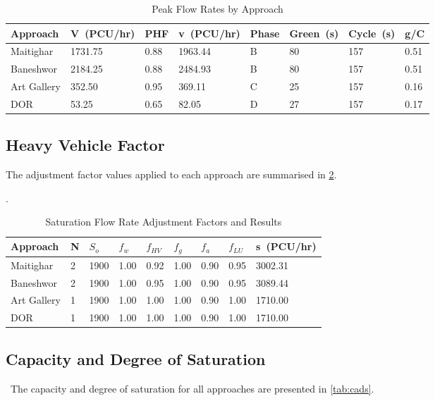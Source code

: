 \begin{table} [h!]
   \centering
   \caption{Peak Flow Rates by Approach}
   \begin{tabular}{|p{2cm}|p{1.7cm}|p{1cm}|p{1.7cm}|p{1.1cm}|p{1.2cm}|p{1.2cm}|p{1.2cm}|}
   \hline
   Approach &	V\ (PCU/hr)	& PHF & v\ (PCU/hr) & Phase & Green\ (s) & Cycle\ (s) & g/C \\
   \hline
   Maitighar	&1731.75	&0.88	&1963.44	&B	&80	&157	&0.51 \\
   \hline
   Baneshwor	&2184.25	&0.88	&2484.93	&B	&80	&157	&0.51 \\
   \hline
   Art Gallery	&352.50	    &0.95	&369.11	    &C	&25	&157	&0.16 \\
   \hline
   DOR	        &53.25	    &0.65	&82.05	    &D	&27	&157	&0.17 \\
   \hline
   \end{tabular}
   \label{tab:pfr}
\end{table}

\pagebreak
\subsection{Heavy Vehicle Factor}
The adjustment factor values applied to each approach are 
summarised in \cref{tab:sfr}.

\begin{table} [h!]
   \centering
   \caption{Saturation Flow Rate Adjustment Factors and Results}
.  \begin{tabular}{|p{1.9cm}|p{0.3cm}|p{1cm}|p{1cm}|p{1.3cm}|p{1cm}|p{1cm}|p{1cm}|p{1.7cm}|}
   \hline
   Approach & N  & $S_o$ & $f_w$  & $f_{HV}$  & $f_g$ & $f_a$  & $f_{LU}$ & s\ (PCU/hr)\\
   \hline
   Maitighar	    &2	&1900	&1.00	&0.92	&1.00	&0.90	&0.95	&3002.31 \\
   Baneshwor	    &2	&1900	&1.00	&0.95	&1.00	&0.90	&0.95	&3089.44 \\
   Art Gallery	    &1	&1900	&1.00	&1.00	&1.00	&0.90	&1.00	&1710.00 \\
   DOR	            &1	&1900	&1.00	&1.00	&1.00	&0.90	&1.00	&1710.00 \\
   \hline
   \end{tabular}
   \label{tab:sfr}
\end{table}

\subsection{Capacity and Degree of Saturation}\
The capacity and degree of saturation for all 
approaches are presented in \cref{tab:cads}.


